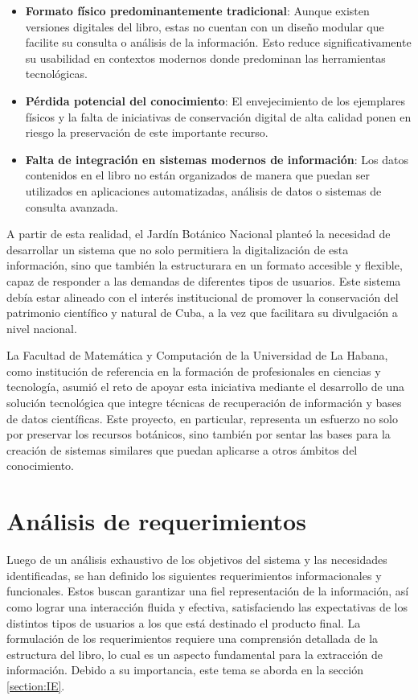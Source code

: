 \begin{itemize}
    \item \textbf{Formato físico predominantemente tradicional}: Aunque existen versiones 
    digitales del libro, estas no cuentan con un diseño modular que facilite su consulta 
    o análisis de la información. Esto reduce significativamente su usabilidad en contextos 
    modernos donde predominan las herramientas tecnológicas.
    \item \textbf{Pérdida potencial del conocimiento}: El envejecimiento de los ejemplares físicos 
    y la falta de iniciativas de conservación digital de alta calidad ponen en riesgo 
    la preservación de este importante recurso.
    \item \textbf{Falta de integración en sistemas modernos de información}: Los datos 
    contenidos en el libro no están organizados de manera que puedan ser utilizados 
    en aplicaciones automatizadas, análisis de datos o sistemas de consulta avanzada.
\end{itemize}

A partir de esta realidad, el Jardín Botánico Nacional planteó la necesidad de desarrollar 
un sistema que no solo permitiera la digitalización de esta información, 
sino que también la estructurara en un formato accesible y flexible, 
capaz de responder a las demandas de diferentes tipos de usuarios. 
Este sistema debía estar alineado con el interés institucional de promover la conservación 
del patrimonio científico y natural de Cuba, a la vez que facilitara su divulgación 
a nivel nacional.

La Facultad de Matemática y Computación de la Universidad de La Habana, como institución de referencia en la formación de 
profesionales en ciencias y tecnología, asumió el reto de apoyar esta iniciativa 
mediante el desarrollo de una solución tecnológica que integre técnicas de recuperación 
de información y bases de datos científicas. Este proyecto, en particular, 
representa un esfuerzo no solo por preservar los recursos botánicos, 
sino también por sentar las bases para la creación de sistemas similares que puedan 
aplicarse a otros ámbitos del conocimiento.





\section{Análisis de requerimientos}\label{section:AnalisisRequerimientos}
Luego de un análisis exhaustivo de los objetivos del sistema y las necesidades 
identificadas, se han definido los siguientes requerimientos informacionales y funcionales. 
Estos buscan garantizar una fiel representación de la información, así como 
lograr una interacción fluida y efectiva, 
satisfaciendo las expectativas de los distintos tipos de usuarios a los
que está destinado el producto final. La formulación de los requerimientos requiere una comprensión detallada de la 
estructura del libro, lo cual es un aspecto fundamental para la extracción de información. Debido a su importancia, 
este tema se aborda en la sección \ref{section:IE}.

